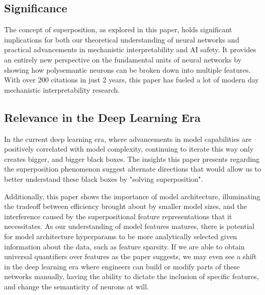 
\subsection{Significance}

The concept of superposition, as explored in this paper, holds significant implications for both our theoretical understanding of neural networks and practical advancements in mechanistic interpretability and AI safety.
It provides an entirely new perspective on the fundamental units of neural networks by showing how polysemantic neurons can be broken down into multiple features.
With over 200 citations in just 2 years, this paper has fueled a lot of modern day mechanistic interpretability research.

\subsection{Relevance in the Deep Learning Era}

In the current deep learning era, where advancements in model capabilities are positively correlated with model complexity, continuing to iterate this way only creates bigger, and bigger black boxes.
The insights this paper presents regarding the superposition phenomenon suggest alternate directions that would allow us to better understand these black boxes by "solving superposition".

Additionally, this paper shows the importance of model architecture, illuminating the tradeoff between efficiency brought about by smaller model sizes, and the interference caused by the superpositional feature representations that it necessitates.
As our understanding of model features matures, there is potential for model architecture hyperparams to be more analytically selected given information about the data, such as feature sparsity.
If we are able to obtain universal quantifiers over features as the paper suggests, we may even see a shift in the deep learning era where engineers can build or modify parts of these networks manually, having the ability to dictate the inclusion of specific features, and change the semanticity of neurons at will.
